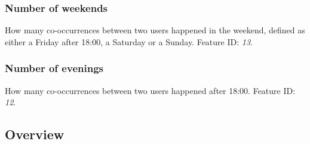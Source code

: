 \subsubsection{Number of weekends}
How many co-occurrences between two users happened in the weekend, defined as either a Friday after 18:00, a Saturday or a Sunday.
Feature ID: \textit{13}.

\subsubsection{Number of evenings}
How many co-occurrences between two users happened after 18:00.
Feature ID: \textit{12}.

\subsection{Overview}

